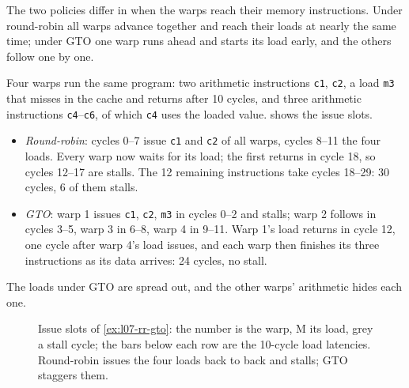 \documentclass[../main.tex]{subfiles}
\begin{document}
%
The two policies differ in when the warps reach their memory
instructions.  Under round-robin all warps advance together and reach
their loads at nearly the same time; under GTO one warp runs ahead and
starts its load early, and the others follow one by one.

\begin{example}
  \label{ex:l07-rr-gto}
  Four warps run the same program: two arithmetic instructions
  \texttt{c1}, \texttt{c2}, a load \texttt{m3} that misses in the
  cache and returns after 10 cycles, and three arithmetic instructions
  \texttt{c4}--\texttt{c6}, of which \texttt{c4} uses the loaded
  value.   shows the issue slots.
  \begin{itemize}
    \item \emph{Round-robin}: cycles 0--7 issue \texttt{c1} and
      \texttt{c2} of all warps, cycles 8--11 the four loads.  Every
      warp now waits for its load; the first returns in cycle 18, so
      cycles 12--17 are stalls.  The 12 remaining instructions take
      cycles 18--29: 30 cycles, 6 of them stalls.
    \item \emph{GTO}: warp 1 issues \texttt{c1}, \texttt{c2},
      \texttt{m3} in cycles 0--2 and stalls; warp 2 follows in cycles
      3--5, warp 3 in 6--8, warp 4 in 9--11.  Warp 1's load returns
      in cycle 12, one cycle after warp 4's load issues, and each warp then
      finishes its three instructions as its data arrives: 24 cycles,
      no stall.
  \end{itemize}
  The loads under GTO are spread out, and the other warps' arithmetic
  hides each one.
\end{example}

\begin{figure}[tb]
  \centering
  
  \caption{Issue slots of \cref{ex:l07-rr-gto}: the number is the warp,
    M its load, grey a stall cycle; the bars below each row are the
    10-cycle load latencies.  Round-robin issues the four loads back
    to back and stalls; GTO staggers them.}
  \label{fig:l07-rr-gto}
\end{figure}
\end{document}
